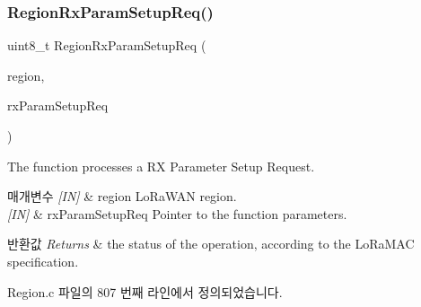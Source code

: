 \subsubsection{\texorpdfstring{Region\+Rx\+Param\+Setup\+Req()}{RegionRxParamSetupReq()}}
{\footnotesize\ttfamily uint8\+\_\+t Region\+Rx\+Param\+Setup\+Req (\begin{DoxyParamCaption}\item[{\mbox{\hyperlink{group___l_o_r_a_m_a_c_ga80c48efda9ae02e14b58160d34a798dd}{Lo\+Ra\+Mac\+Region\+\_\+t}}}]{region,  }\item[{\mbox{\hyperlink{group___r_e_g_i_o_n_ga7165f282c670c728c36d534df2285157}{Rx\+Param\+Setup\+Req\+Params\+\_\+t}} $\ast$}]{rx\+Param\+Setup\+Req }\end{DoxyParamCaption})}



The function processes a RX Parameter Setup Request. 


\begin{DoxyParams}{매개변수}
{\em \mbox{[}\+I\+N\mbox{]}} & region Lo\+Ra\+W\+AN region.\\
\hline
{\em \mbox{[}\+I\+N\mbox{]}} & rx\+Param\+Setup\+Req Pointer to the function parameters.\\
\hline
\end{DoxyParams}

\begin{DoxyRetVals}{반환값}
{\em Returns} & the status of the operation, according to the Lo\+Ra\+M\+AC specification. \\
\hline
\end{DoxyRetVals}


Region.\+c 파일의 807 번째 라인에서 정의되었습니다.


